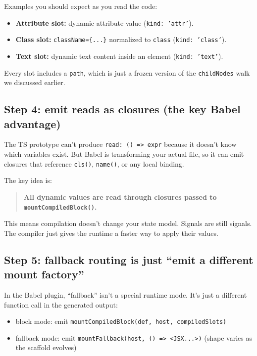 Examples you should expect as you read the code:

\begin{itemize}
\item \textbf{Attribute slot:} dynamic attribute value (\texttt{kind: 'attr'}).
\item \textbf{Class slot:} \texttt{className=\{...\}} normalized to \texttt{class} (\texttt{kind: 'class'}).
\item \textbf{Text slot:} dynamic text content inside an element (\texttt{kind: 'text'}).
\end{itemize}

Every slot includes a \texttt{path}, which is just a frozen version of the \texttt{childNodes} walk we discussed earlier.

\subsection{Step 4: emit reads as closures (the key Babel advantage)}

The TS prototype can't produce \texttt{read: () => expr} because it doesn't know which variables exist.
But Babel is transforming your actual file, so it can emit closures that reference \texttt{cls()}, \texttt{name()}, or any local binding.

The key idea is:

\begin{quote}
	\textbf{All dynamic values are read through closures passed to \texttt{mountCompiledBlock()}.}
\end{quote}

This means compilation doesn't change your state model.
Signals are still signals.
The compiler just gives the runtime a faster way to apply their values.

\subsection{Step 5: fallback routing is just ``emit a different mount factory''}

In the Babel plugin, ``fallback'' isn't a special runtime mode.
It's just a different function call in the generated output:

\begin{itemize}
\item block mode: emit \texttt{mountCompiledBlock(def, host, compiledSlots)}
\item fallback mode: emit \texttt{mountFallback(host, () => <JSX...>)} (shape varies as the scaffold evolves)
\end{itemize}

